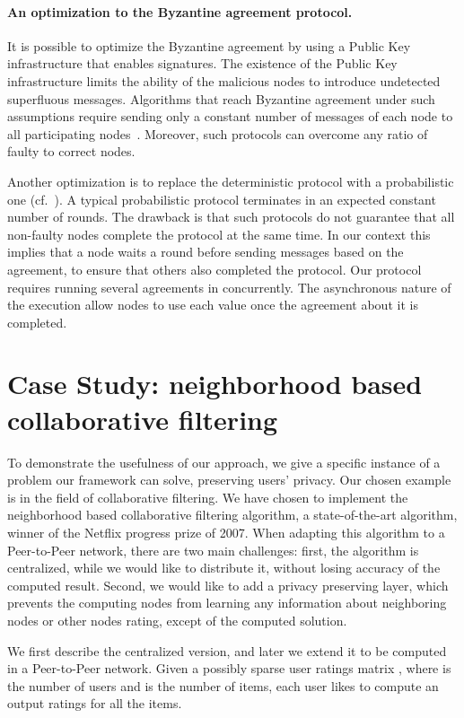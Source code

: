\documentclass[10pt]{svjour3}
\begin{document}
\paragraph{An optimization to the Byzantine agreement protocol.}
It is possible to optimize the Byzantine agreement by using a Public Key infrastructure that enables signatures.
The existence of the Public Key infrastructure limits the ability of the malicious nodes to introduce undetected superfluous messages.  Algorithms that reach Byzantine agreement under such assumptions require sending only a constant number of messages of each node to all participating nodes~\cite{DS82}. Moreover, such protocols can overcome any ratio of faulty to correct nodes.

Another optimization is to replace the deterministic protocol with a probabilistic one (cf.~\cite{Benor83,FM89,CR93}). A typical probabilistic protocol terminates in an expected constant number of rounds.  The drawback is that such protocols do not guarantee that all non-faulty nodes complete the protocol at the same time. In our context this implies that a node waits a round before sending messages based on the agreement, to ensure that others also completed the protocol. Our protocol requires running several agreements in concurrently.  The asynchronous nature of the execution allow nodes to use each value once the agreement about it is completed.



\section{Case Study: neighborhood based collaborative filtering}
\label{jacobi} To demonstrate the usefulness of our approach, we
give a specific instance of a problem our framework can solve,
preserving users' privacy. Our chosen example is in the field of
collaborative filtering. We have chosen to implement the
neighborhood based collaborative filtering algorithm, a
state-of-the-art algorithm, winner of the Netflix progress prize
of 2007. When adapting this algorithm to a Peer-to-Peer network,
there are two main challenges: first, the algorithm is
centralized, while we would like to distribute it, without losing
accuracy of the computed result. Second, we would like to add a
privacy preserving layer, which prevents the computing nodes from
learning any information about neighboring nodes or other nodes
rating, except of the computed solution.

We first describe the centralized version, and later we extend it
to be computed in a Peer-to-Peer network. Given a possibly sparse
user ratings matrix , where  is the number of
users and  is the number of items, each user likes to compute
an output ratings for all the items.
\end{document}
